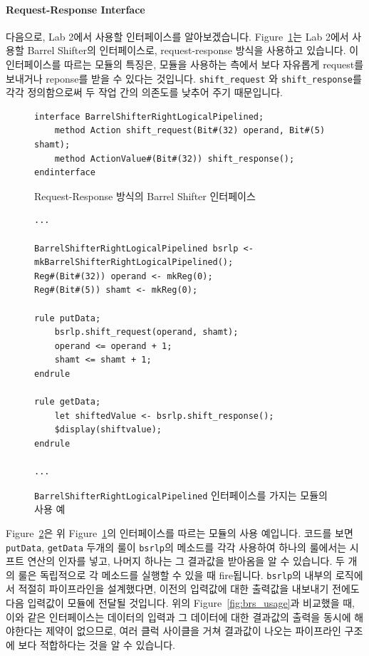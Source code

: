 \documentclass{article}
\begin{document}
\paragraph{Request-Response Interface}
다음으로, Lab 2에서 사용할 인터페이스를 알아보겠습니다.
Figure~\ref{fig:brs_rr_interface}는 Lab 2에서 사용할 Barrel Shifter의 인터페이스로, request-response 방식을 사용하고 있습니다.
이 인터페이스를 따르는 모듈의 특징은, 모듈을 사용하는 측에서 보다 자유롭게 request를 보내거나 reponse를 받을 수 있다는 것입니다.
\texttt{shift\_request} 와 \texttt{shift\_response}를 각각 정의함으로써 두 작업 간의 의존도를 낮추어 주기 때문입니다.

\begin{figure}[!hb]
	\centering
\begin{Verbatim}
interface BarrelShifterRightLogicalPipelined;
	method Action shift_request(Bit#(32) operand, Bit#(5) shamt);
	method ActionValue#(Bit#(32)) shift_response();
endinterface
\end{Verbatim}
	\caption{Request-Response 방식의 Barrel Shifter 인터페이스\label{fig:brs_rr_interface}}
\end{figure}
\begin{figure}[!ht]
	\centering
\begin{Verbatim}
...

BarrelShifterRightLogicalPipelined bsrlp <- mkBarrelShifterRightLogicalPipelined();
Reg#(Bit#(32)) operand <- mkReg(0);
Reg#(Bit#(5)) shamt <- mkReg(0);

rule putData;
	bsrlp.shift_request(operand, shamt);
	operand <= operand + 1;
	shamt <= shamt + 1;
endrule

rule getData;
	let shiftedValue <- bsrlp.shift_response();
	$display(shiftvalue);
endrule

...
\end{Verbatim}
	\caption{\texttt{BarrelShifterRightLogicalPipelined} 인터페이스를 가지는 모듈의 사용 예}
	\label{fig:brs_rr_usage}
\end{figure}
\noindent Figure~\ref{fig:brs_rr_usage}은 위 Figure~\ref{fig:brs_rr_interface}의 인터페이스를 따르는 모듈의 사용 예입니다.
코드를 보면 \texttt{putData}, \texttt{getData} 두개의 룰이 \texttt{bsrlp}의 메소드를 각각 사용하여 
하나의 룰에서는 시프트 연산의 인자를 넣고, 나머지 하나는 그 결과값을 받아옴을 알 수 있습니다.
두 개의 룰은 독립적으로 각 메소드를 실행할 수 있을 때 fire됩니다.
\texttt{bsrlp}의 내부의 로직에서 적절히 파이프라인을 설계했다면,
이전의 입력값에 대한 출력값을 내보내기 전에도 다음 입력값이 모듈에 전달될 것입니다.
위의 Figure~\ref{fig:brs_usage}과 비교했을 때, 이와 같은 인터페이스는
데이터의 입력과 그 데이터에 대한 결과값의 출력을 동시에 해야한다는 제약이 없으므로,
여러 클럭 사이클을 거쳐 결과값이 나오는 파이프라인 구조에 보다 적합하다는 것을 알 수 있습니다.
\end{document}
